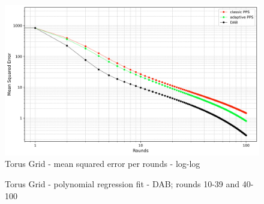 \begin{figure}[]
    \centering
    \includegraphics[width=\linewidth]{figures/Simulation_outcomes/TorusGridGraph/DAB_vs_PPS_TGG_r100_n1024_averaged_loglog.png}
    \caption{Torus Grid - mean squared error per rounds - log-log}
    \label{fig:torusMSEperRoundLogLog}
\end{figure}
\begin{figure}[!ht]
     \centering
     \hfil
     \caption{Torus Grid - polynomial regression fit - DAB; rounds 10-39 and 40-100}
         \label{fig:dabTorusModelFit}
 \end{figure}
